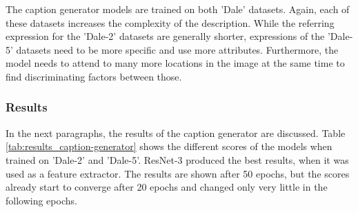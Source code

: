The caption generator models are trained on both 'Dale' datasets.
Again, each of these datasets increases the complexity of the description.
While the referring expression for the 'Dale-2' datasets are generally shorter, expressions of the 'Dale-5' datasets need to be more specific and use more attributes.
Furthermore, the model needs to attend to many more locations in the image at the same time to find discriminating factors between those.

\subsubsection*{Results}
In the next paragraphs, the results of the caption generator are discussed.
Table \ref{tab:results_caption-generator} shows the different scores of the models when trained on 'Dale-2' and 'Dale-5'.
ResNet-3 produced the best results, when it was used as a feature extractor.
The results are shown after 50 epochs, but the scores already start to converge after 20 epochs and changed only very little in the following epochs.

